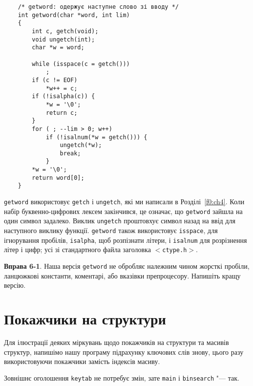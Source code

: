 \documentclass[a4paper,12pt]{book}
\begin{document}
  \begin{verbatim}
    /* getword: одержує наступне слово зі вводу */
    int getword(char *word, int lim)
    {
        int c, getch(void);
        void ungetch(int);
        char *w = word;

        while (isspace(c = getch()))
            ;
        if (c != EOF)
            *w++ = c;
        if (!isalpha(c)) {
            *w = '\0';
            return c;
        }
        for ( ; --lim > 0; w++)
            if (!isalnum(*w = getch())) {
                ungetch(*w);
                break;
            }
        *w = '\0';
        return word[0];
    }
  \end{verbatim}

  \texttt{getword} використовує \texttt{getch} і \texttt{ungetch}, які ми написали в
  Розділі~\ref{f0:ch4}. Коли набір буквенно-цифрових лексем закінчився,
  це означає, що \texttt{getword} зайшла на один символ задалеко. Виклик \texttt{ungetch}
  проштовхує символ назад на ввід для наступного виклику функції. \texttt{getword} також
  використовує \texttt{isspace}, для ігнорування пробілів, \texttt{isalpha}, щоб
  розпізнати літери, і \texttt{isalnum} для розрізнення літер і цифр; усі зі стандартного
  файла заголовка \texttt{\mbox{$<$}ctype.h\mbox{$>$}}.

  \textbf{Вправа 6-1}. Наша версія \texttt{getword} не обробляє належним чином жорсткі
  пробіли, ланцюжкові константи, коментарі, або вказівки препроцесору. Напишіть кращу
  версію.

\section{Покажчики на структури}


  Для ілюстрації деяких міркувань щодо покажчиків на структури та масивів структур,
  напишімо нашу програму підрахунку ключових слів знову, цього разу використовуючи
  покажчики замість індексів масиву.

  Зовнішнє оголошення \texttt{keytab} не потребує змін, зате \texttt{main} і
  \texttt{binsearch} "--- так.
\end{document}
